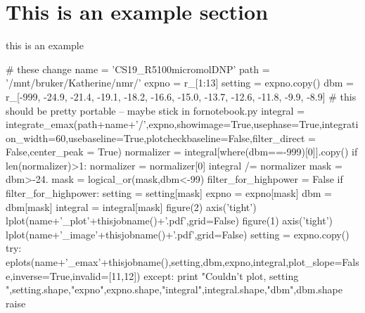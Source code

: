 \section{This is an example section}
this is an example

\begin{python}
	# these change
	name = 'CS19_R5100micromolDNP'
	path = '/mnt/bruker/Katherine/nmr/'
	expno = r_[1:13]
	setting = expno.copy()
	dbm = r_[-999,
	  -24.9,
	  -21.4,
	  -19.1,
	  -18.2,
	  -16.6,
	  -15.0,
	  -13.7,
	  -12.6,
	  -11.8,
	  -9.9,
	  -8.9]
	# this should be pretty portable -- maybe stick in fornotebook.py
	integral = integrate_emax(path+name+'/',expno,showimage=True,usephase=True,integration_width=60,usebaseline=True,plotcheckbaseline=False,filter_direct = False,center_peak = True)
	normalizer = integral[where(dbm==-999)[0]].copy()
	if len(normalizer)>1:
	   normalizer = normalizer[0]
	integral /= normalizer
	mask = dbm>-24.
	mask = logical_or(mask,dbm<-99)
	filter_for_highpower = False
	if filter_for_highpower:
	   setting = setting[mask]
	   expno = expno[mask]
	   dbm = dbm[mask]
	   integral = integral[mask]
	figure(2)
	axis('tight')
	lplot(name+'_plot'+thisjobname()+'.pdf',grid=False)
	figure(1)
	axis('tight')
	lplot(name+'_image'+thisjobname()+'.pdf',grid=False)
	setting = expno.copy()
	try:
	   eplots(name+'_emax'+thisjobname(),setting,dbm,expno,integral,plot_slope=False,inverse=True,invalid=[11,12])
	except:
	   print "Couldn't plot, setting ",setting.shape,"expno",expno.shape,"integral",integral.shape,"dbm",dbm.shape
	   raise
\end{python}
